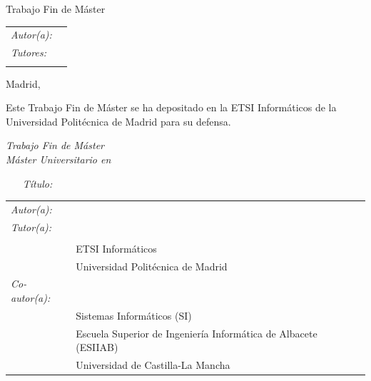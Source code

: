 \begin{titlepage}
\vspace*{1cm}
\begin{center}
\huge{ Trabajo Fin de Máster }
\end{center}

\vspace*{0.5cm}
\begin{center}
\huge\bfseries {  \TituloTFM{} } 
\end{center}

\vspace*{5cm}

\noindent
\begin{tabular}{ll}
\Large{\textit{Autor(a):}} & \Large{\NombreAutor{}} \\
\Large{\textit{Tutores:}} & \Large{\NombreTutor{}}  \\ 
 & \Large{\NombreCoTutor{}}
\end{tabular} 

\vspace*{4cm}
\begin{center}
Madrid, \Fecha
\end{center}

\newpage
\thispagestyle{empty}
\noindent
Este Trabajo Fin de Máster se ha depositado en la ETSI Informáticos de la Universidad Politécnica de Madrid para su defensa.

\vspace*{4cm}
\noindent
\textit{Trabajo Fin de Máster}\\
\textit{Máster Universitario en} \Master{}

\begin{enumerate}
\item[\textit{Título:}] \TituloTFM{}
\end{enumerate}
\Fecha


\vspace*{3cm}

\noindent
\begin{tabular}{ll}
\textit{Autor(a):} & \NombreAutor{}  \\ 
\textit{Tutor(a):} & \NombreTutor{}  \\ 
                & \Departamento{} \\
                & ETSI Informáticos\\
                & Universidad Politécnica de Madrid\\
\textit{Co-autor(a):} & \NombreCoTutor{} \\
					  & Sistemas Informáticos (SI)\\
					  & Escuela Superior de Ingeniería Informática de Albacete (ESIIAB)\\
					  & Universidad de Castilla-La Mancha
\end{tabular} 

\end{titlepage}
